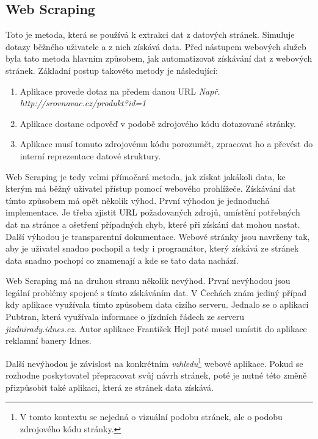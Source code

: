 \subsection{Web Scraping}
\label{sec:webscraping}
Toto je metoda, která se používá k extrakci dat z datových stránek. Simuluje dotazy běžného uživatele a z nich získává data. Před nástupem webových služeb byla tato metoda hlavním způsobem, jak automatizovat získávání dat z webových stránek\cite{oreilly2007web}. Základní postup takovéto metody je následující:

\begin{enumerate}
\item Aplikace provede dotaz na předem danou URL \newline \emph{Např. http://srovnavac.cz/produkt?id=1}
\item Aplikace dostane odpověď v podobě zdrojového kódu dotazované stránky.
\item Aplikace musí tomuto zdrojovému kódu porozumět, zpracovat ho a převést do interní reprezentace datové struktury.
\end{enumerate}

Web Scraping je tedy velmi přímočará metoda, jak získat jakákoli data, ke kterým má běžný uživatel přístup pomocí webového prohlížeče. Získávání dat tímto způsobem má opět několik výhod. První výhodou je jednoduchá implementace. Je třeba zjistit URL požadovaných zdrojů, umístění potřebných dat na stránce a ošetření případných chyb, které při získání dat mohou nastat. Další výhodou je transparentní dokumentace. Webové stránky jsou navrženy tak, aby je uživatel snadno pochopil a tedy i programátor, který získává ze stránek data snadno pochopí co znamenají a kde se tato data nachází.

Web Scraping má na druhou stranu několik nevýhod. První nevýhodou jsou legální problémy spojené s tímto získáváním dat. V Čechách znám jediný případ kdy aplikace využívala tímto způsobem data cizího serveru. Jednalo se o aplikaci Pubtran, která využívala informace o jízdních řádech ze serveru \emph{jizdnirady.idnes.cz}. Autor aplikace František Hejl poté musel umístit do aplikace reklamní banery Idnes.

Další nevýhodou je závislost na konkrétním \emph{vzhledu}\footnote{V tomto kontextu se nejedná o vizuální podobu stránek, ale o podobu zdrojového kódu stránky.} webové aplikace. Pokud se rozhodne poskytovatel přepracovat svůj návrh stránek, poté je nutné této změně přizpůsobit také aplikaci, která ze stránek data získává.

